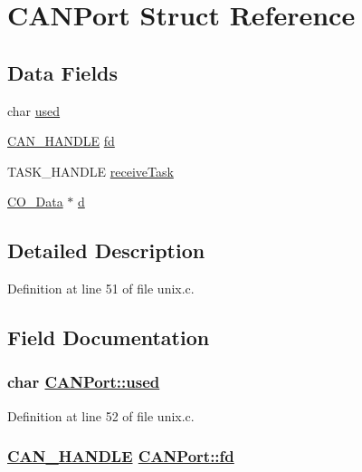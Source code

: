 \hypertarget{structCANPort}{
\section{CANPort Struct Reference}
\label{structCANPort}
}
\subsection*{Data Fields}
\begin{CompactItemize}
\item 
char \hyperlink{structCANPort_9282729cb1b89dd5594435fbaf162e11}{used}
\item 
\hyperlink{win32_2applicfg_8h_712c7b28987b12b8d400df19c92d0f5e}{CAN\_\-HANDLE} \hyperlink{structCANPort_79262404ede9b4eb131a84b49454b7e7}{fd}
\item 
TASK\_\-HANDLE \hyperlink{structCANPort_c9022d9f15fbff963b1bdb1e914dc871}{receive\-Task}
\item 
\hyperlink{structstruct__CO__Data}{CO\_\-Data} $\ast$ \hyperlink{structCANPort_45112279ca87924f3ecfc9fdb019cd69}{d}
\end{CompactItemize}


\subsection{Detailed Description}




Definition at line 51 of file unix.c.

\subsection{Field Documentation}
\hypertarget{structCANPort_9282729cb1b89dd5594435fbaf162e11}{
\subsubsection[used]{\setlength{\rightskip}{0pt plus 5cm}char \hyperlink{structCANPort_9282729cb1b89dd5594435fbaf162e11}{CANPort::used}}}
\label{structCANPort_9282729cb1b89dd5594435fbaf162e11}




Definition at line 52 of file unix.c.\hypertarget{structCANPort_79262404ede9b4eb131a84b49454b7e7}{
\subsubsection[fd]{\setlength{\rightskip}{0pt plus 5cm}\hyperlink{win32_2applicfg_8h_712c7b28987b12b8d400df19c92d0f5e}{CAN\_\-HANDLE} \hyperlink{structCANPort_79262404ede9b4eb131a84b49454b7e7}{CANPort::fd}}}
\label{structCANPort_79262404ede9b4eb131a84b49454b7e7}





